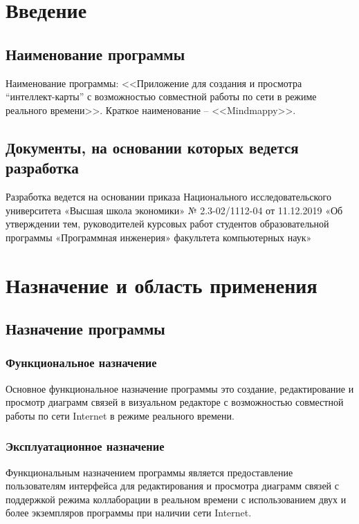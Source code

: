 \documentclass[a4paper,12pt]{article}
\begin{document}
    \section{Введение}

    \subsection{Наименование программы}
    Наименование программы: <<Приложение для создания и просмотра “интеллект-карты” с возможностью совместной работы по сети в режиме реального времени>>. Краткое наименование -- <<Mindmappy>>.

    \subsection{Документы, на основании которых ведется разработка}
    Разработка ведется на основании приказа Национального исследовательского
    университета «Высшая школа экономики» № 2.3-02/1112-04 от 11.12.2019 «Об утверждении тем, руководителей курсовых работ студентов образовательной программы «Программная инженерия» факультета компьютерных наук»
    \newpage


    \section{Назначение и область применения}

    \subsection{Назначение программы }

    \subsubsection{Функциональное назначение}
    Основное функциональное назначение программы это создание, редактирование и просмотр диаграмм связей в визуальном редакторе с возможностью совместной работы по сети Internet в режиме реального времени.

    \subsubsection{Эксплуатационное назначение}
    Функциональным назначением программы является предоставление пользователям интерфейса для редактирования и просмотра диаграмм связей с поддержкой режима коллаборации в реальном времени с использованием двух и более экземпляров программы при наличии сети Internet.
\end{document}
